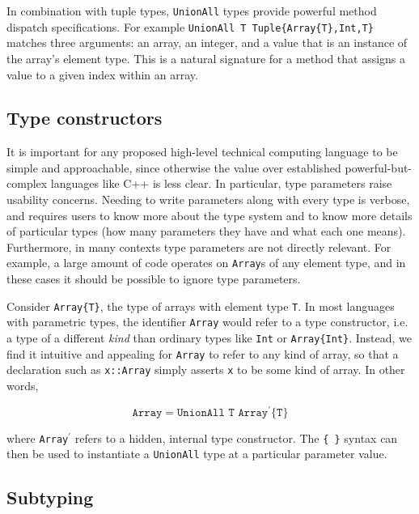 In combination with tuple types, \texttt{UnionAll} types provide powerful
method dispatch specifications. For example
\texttt{UnionAll T Tuple\{Array\{T\},Int,T\}} matches three arguments:
an array, an integer, and a value that is an instance of the array's
element type. This is a natural signature for a method that assigns a
value to a given index within an array.


\subsection{Type constructors}

It is important for any proposed high-level technical computing language to be
simple and approachable, since otherwise the value over established
powerful-but-complex languages like C++ is less clear.
In particular, type parameters raise usability concerns.
Needing to write parameters along with every type is verbose, and requires users
to know more about the type system and to know more details of particular
types (how many parameters they have and what each one means).
Furthermore, in many contexts type parameters are not directly relevant.
For example, a large amount of code operates on \texttt{Array}s of any
element type, and in these cases it should be possible to ignore type parameters.

Consider \texttt{Array\{T\}}, the type of arrays with element type \texttt{T}.
In most languages with parametric types, the identifier \texttt{Array} would
refer to a type constructor, i.e. a type of a different \emph{kind} than
ordinary types like \texttt{Int} or \texttt{Array\{Int\}}.
Instead, we find it intuitive and appealing for \texttt{Array} to refer to
any kind of array, so that a declaration such as \texttt{x::Array} simply
asserts \texttt{x} to be some kind of array. In other words,

\vspace{-3ex}
\[
\texttt{Array} = \texttt{UnionAll T Array$^\prime$\{T\}}
\]

\noindent
where \texttt{Array$^\prime$} refers to a hidden, internal type constructor.
The \texttt{\{ \}} syntax can then be used to instantiate a \texttt{UnionAll}
type at a particular parameter value.


\subsection{Subtyping}

